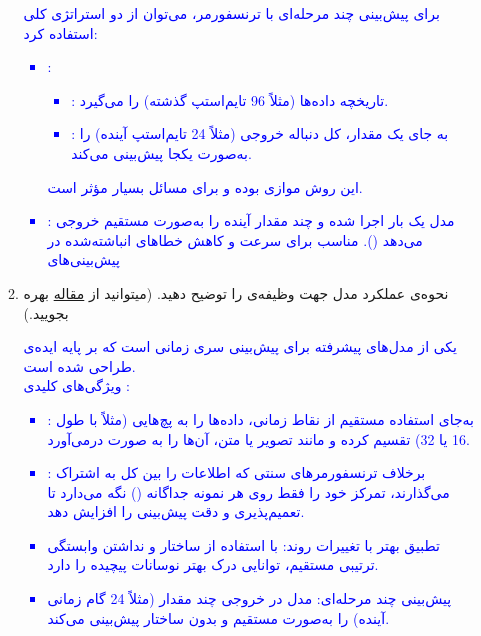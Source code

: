\documentclass[12pt]{article}
\begin{document}
\begin{enumerate}
\begin{enumerate}
        \textcolor{blue}{
        برای پیش‌بینی چند مرحله‌ای با ترنسفورمر، می‌توان از دو استراتژی کلی استفاده کرد:
        \begin{itemize}
            \item {}:
            \begin{itemize}
                \item {}: تاریخچه داده‌ها (مثلاً 96 تایم‌استپ گذشته) را می‌گیرد.
                \item {}: به جای یک مقدار، کل دنباله خروجی (مثلاً 24 تایم‌استپ آینده) را به‌صورت یکجا پیش‌بینی می‌کند.
            \end{itemize}
            این روش موازی بوده و برای مسائل  بسیار مؤثر است.
            \item {}:
            مدل یک بار اجرا شده و چند مقدار آینده را به‌صورت مستقیم خروجی می‌دهد (). مناسب برای سرعت و کاهش خطاهای انباشته‌شده  در پیش‌بینی‌های  
        \end{itemize}
        }
        \item نحوه‌ی عملکرد مدل  جهت وظیفه‌ی  را توضیح دهید. (میتوانید از \href{https://arxiv.org/pdf/2310.06625}{مقاله} بهره بجویید.)

        \textcolor{blue}{
         یکی از مدل‌های پیشرفته برای پیش‌بینی سری زمانی است که بر پایه ایده‌ی   طراحی شده است.\\
        ویژگی‌های کلیدی :
        \begin{itemize}
            \item {}: به‌جای استفاده مستقیم از نقاط زمانی،  داده‌ها را به پچ‌هایی (مثلاً با طول 16 یا 32) تقسیم کرده و مانند تصویر یا متن، آن‌ها را به صورت   درمی‌آورد.
            \item {}:
            برخلاف ترنسفورمرهای سنتی که اطلاعات را بین کل  به اشتراک می‌گذارند،  تمرکز خود را فقط روی هر نمونه جداگانه () نگه می‌دارد تا تعمیم‌پذیری و دقت پیش‌بینی را افزایش دهد.
            \item تطبیق بهتر با تغییرات روند:
            با استفاده از ساختار  و نداشتن وابستگی ترتیبی مستقیم،  توانایی درک بهتر نوسانات پیچیده را دارد.
            \item پیش‌بینی چند مرحله‌ای: مدل در خروجی چند مقدار (مثلاً 24 گام زمانی آینده) را به‌صورت مستقیم و بدون ساختار  پیش‌بینی می‌کند.
        \end{itemize}
        }
    \end{enumerate}
    

\end{enumerate}
\end{document}
